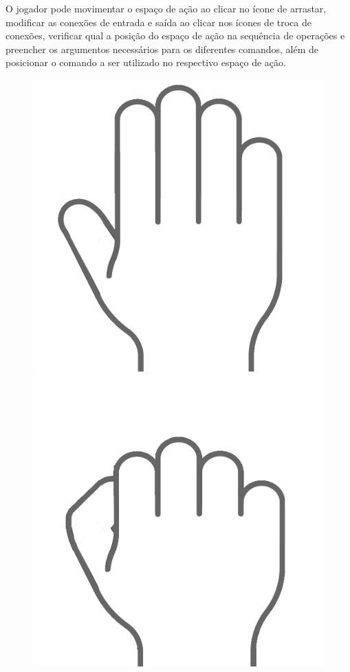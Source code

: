 O jogador pode movimentar o espaço de ação ao clicar no ícone de arrastar, 
modificar as conexões de entrada e saída ao clicar nos ícones de troca de 
conexões, verificar qual a posição do espaço de ação na sequência de 
operações e preencher os argumentos necessários para os diferentes comandos,
além de posicionar o comando a ser utilizado no respectivo espaço de ação.

\begin{figure}[H]
    \centering
    \begin{minipage}{.4\textwidth}
      \centering
      \includegraphics[scale=0.1]{../figuras/open_hand_icon.png}
    \end{minipage}%
    \begin{minipage}{.4\textwidth}
      \centering
      \includegraphics[scale=0.1]{../figuras/closed_hand_icon.png}

\end{minipage}
\end{figure}
